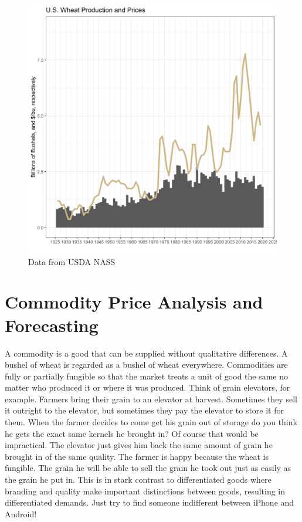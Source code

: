 \documentclass[
]{book}
\begin{document}
\begin{figure}
\centering
\includegraphics{assets/PrimerforGrain_WheatProdand$.png}
\caption{Data from USDA NASS}
\end{figure}

\hypertarget{commodity-price-analysis-and-forecasting}{%
\chapter{Commodity Price Analysis and Forecasting}\label{commodity-price-analysis-and-forecasting}}

A commodity is a good that can be supplied without qualitative differences. A bushel of wheat is regarded as a bushel of wheat everywhere. Commodities are fully or partially fungible so that the market treats a unit of good the same no matter who produced it or where it was produced. Think of grain elevators, for example. Farmers bring their grain to an elevator at harvest. Sometimes they sell it outright to the elevator, but sometimes they pay the elevator to store it for them. When the farmer decides to come get his grain out of storage do you think he gets the exact same kernels he brought in? Of course that would be impractical. The elevator just gives him back the same amount of grain he brought in of the same quality. The farmer is happy because the wheat is fungible. The grain he will be able to sell the grain he took out just as easily as the grain he put in. This is in stark contrast to differentiated goods where branding and quality make important distinctions between goods, resulting in differentiated demands. Just try to find someone indifferent between iPhone and Android!
\end{document}
